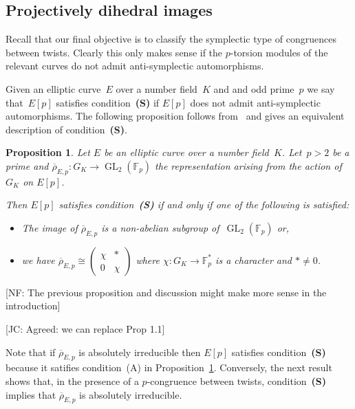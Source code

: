 \documentclass[12pt, reqno]{amsart}
\newcommand{\F}{\mathbb{F}}
\newcommand{\rhobar}{{\overline{\rho}}}
\newcommand{\GL}{\operatorname{GL}}
\numberwithin{equation}{section}
\newtheorem{proposition}[theorem]{Proposition}
\theoremstyle{definition}
\theoremstyle{remark}
\newcommand{\nf}[1]{{\color{blue} \textsf{[NF: #1]}}}
\newcommand{\jc}[1]{{\color{darkgreen} \textsf{[JC: #1]}}}
\begin{document}
\subsection{Projectively dihedral images}
Recall that our final objective is to classify the symplectic type of congruences between twists. Clearly this only makes sense if the $p$-torsion modules of the relevant curves do not admit anti-symplectic automorphisms. 

Given an elliptic curve~$E$ over a number field~$K$ and and odd prime~$p$ we say 
that~$E[p]$ satisfies condition~{\bf (S)} if $E[p]$ does not admit anti-symplectic automorphisms. The following proposition follows from~\cite{FKSym} and gives an equivalent description of condition~{\bf (S)}.

\begin{proposition} \label{P:conditionS}
Let $E$ be an elliptic curve over a number field~$K$. Let~$p > 2$ be a prime and $\rhobar_{E,p} : G_K \to \GL_2(\F_p)$ the representation arising from the action of~$G_K$ on $E[p]$. 

Then $E[p]$ satisfies condition~{\bf (S)} if and only if one of the following is satisfied:
 \begin{itemize}
 \item[(A)] The image of $\rhobar_{E,p}$ is a non-abelian subgroup of~$\GL_2(\F_p)$ or,
 \item[(B)] we have $\rhobar_{E,p} \cong \left( \begin{smallmatrix} \chi & * \\ 0 & \chi \end{smallmatrix} \right)$ where $\chi : G_K \to \F_p^*$ is a character
 and $* \neq 0$.
 \end{itemize}
\end{proposition}

\nf{The previous proposition and discussion might make more sense in
  the introduction}

\jc{Agreed: we can replace Prop 1.1}


Note that if $\rhobar_{E,p}$ is absolutely irreducible then $E[p]$ satisfies condition~{\bf (S)} because it satifies 
condition~(A) in Proposition~\ref{P:conditionS}. Conversely, the next result shows that, in the presence of a $p$-congruence between twists, condition~{\bf (S)} implies that
$\rhobar_{E,p}$ is absolutely irreducible.
\end{document}
